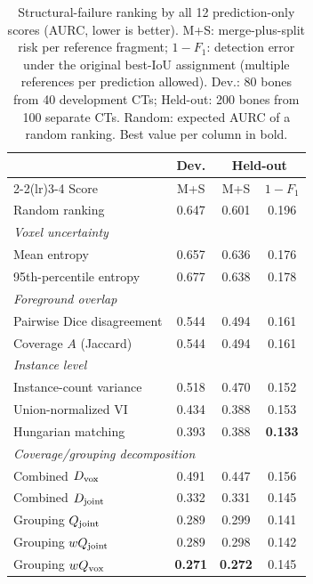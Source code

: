 \begin{table}[t]
\caption{Structural-failure ranking by all 12 prediction-only scores (AURC, lower is better). M+S: merge-plus-split risk per reference fragment; $1-F_1$: detection error under the original best-IoU assignment (multiple references per prediction allowed). Dev.: 80 bones from 40 development CTs; Held-out: 200 bones from 100 separate CTs. Random: expected AURC of a random ranking. Best value per column in bold.}
\label{tab:main}
\centering\footnotesize
\setlength{\tabcolsep}{3.5pt}
\begin{tabular}{lccc}
\toprule
 & Dev. & \multicolumn{2}{c}{Held-out} \\
\cmidrule(lr){2-2}\cmidrule(lr){3-4}
Score & M+S & M+S & $1-F_1$ \\
\midrule
Random ranking & 0.647 & 0.601 & 0.196 \\
\midrule
\multicolumn{4}{l}{\textit{Voxel uncertainty}} \\
\quad Mean entropy & 0.657 & 0.636 & 0.176 \\
\quad 95th-percentile entropy & 0.677 & 0.638 & 0.178 \\
\midrule
\multicolumn{4}{l}{\textit{Foreground overlap}} \\
\quad Pairwise Dice disagreement & 0.544 & 0.494 & 0.161 \\
\quad Coverage $A$ (Jaccard) & 0.544 & 0.494 & 0.161 \\
\midrule
\multicolumn{4}{l}{\textit{Instance level}} \\
\quad Instance-count variance & 0.518 & 0.470 & 0.152 \\
\quad Union-normalized VI & 0.434 & 0.388 & 0.153 \\
\quad Hungarian matching & 0.393 & 0.388 & \textbf{0.133} \\
\midrule
\multicolumn{4}{l}{\textit{Coverage/grouping decomposition}} \\
\quad Combined $D_{\rm vox}$ & 0.491 & 0.447 & 0.156 \\
\quad Combined $D_{\rm joint}$ & 0.332 & 0.331 & 0.145 \\
\quad Grouping $Q_{\rm joint}$ & 0.289 & 0.299 & 0.141 \\
\quad Grouping $wQ_{\rm joint}$ & 0.289 & 0.298 & 0.142 \\
\quad Grouping $wQ_{\rm vox}$ & \textbf{0.271} & \textbf{0.272} & 0.145 \\
\bottomrule
\end{tabular}
\end{table}
